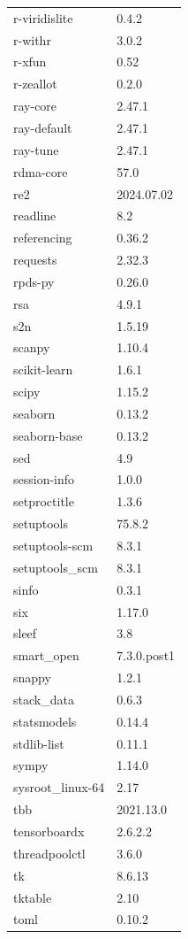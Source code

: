 \begin{longtable}{ll}
    r-viridislite&0.4.2 \\
    r-withr&3.0.2 \\
    r-xfun&0.52 \\
    r-zeallot&0.2.0 \\
    ray-core&2.47.1 \\
    ray-default&2.47.1 \\
    ray-tune&2.47.1 \\
    rdma-core&57.0 \\
    re2&2024.07.02 \\
    readline&8.2 \\
    referencing&0.36.2 \\
    requests&2.32.3 \\
    rpds-py&0.26.0 \\
    rsa&4.9.1 \\
    s2n&1.5.19 \\
    scanpy&1.10.4 \\
    scikit-learn&1.6.1 \\
    scipy&1.15.2 \\
    seaborn&0.13.2 \\
    seaborn-base&0.13.2 \\
    sed&4.9 \\
    session-info&1.0.0 \\
    setproctitle&1.3.6 \\
    setuptools&75.8.2 \\
    setuptools-scm&8.3.1 \\
    setuptools\_scm&8.3.1 \\
    sinfo&0.3.1 \\
    six&1.17.0 \\
    sleef&3.8 \\
    smart\_open&7.3.0.post1 \\
    snappy&1.2.1 \\
    stack\_data&0.6.3 \\
    statsmodels&0.14.4 \\
    stdlib-list&0.11.1 \\
    sympy&1.14.0 \\
    sysroot\_linux-64&2.17 \\
    tbb&2021.13.0 \\
    tensorboardx&2.6.2.2 \\
    threadpoolctl&3.6.0 \\
    tk&8.6.13 \\
    tktable&2.10 \\
    toml&0.10.2 \\

\end{longtable}
